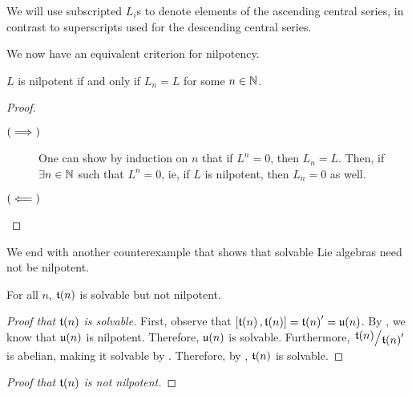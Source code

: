 \begin{boxconvention}
    We will use subscripted $L_i$s to denote elements of the ascending central series, in contrast to superscripts used for the descending central series.
\end{boxconvention}

We now have an equivalent criterion for nilpotency.

\begin{boxproposition}
    $L$ is nilpotent if and only if $L_n = L$ for some $n \in \mathbb{N}$.
\end{boxproposition}
\begin{proof} \hfill
    \begin{description}
        \item[$\left( \implies \right)$]
            One can show by induction on $n$ that if $L^n = 0$, then $L_n = L$. Then, if $\exists n \in \mathbb{N}$ such that $L^n = 0$, ie, if $L$ is nilpotent, then $L_n = 0$ as well.  \sorry %

        \item[$\left( \impliedby \right)$] 
            \sorry
    \end{description}
\end{proof}

We end with another counterexample that shows that solvable Lie algebras need not be nilpotent.

\begin{boxcexample}
    For all $n$, $\mathfrak{t}\!\left( n \right)$ is solvable but not nilpotent.
    \begin{proof}[Proof that $\mathfrak{t}\!\left( n \right)$ is solvable]
        First, observe that $\left[ \mathfrak{t}\!\left( n \right), \mathfrak{t}\!\left( n \right) \right] = \mathfrak{t}\!\left( n \right)' = \mathfrak{u}\!\left( n \right)$. By \sorry, we know that $\mathfrak{u}\!\left( n \right)$ is nilpotent. Therefore, $\mathfrak{u}\!\left( n \right)$ is solvable. Furthermore, $\quotient{\t{n}}{\t{n}'}$ is abelian, making it solvable by \sorry. Therefore, by , $\mathfrak{t}\!\left( n \right)$ is solvable.
    \end{proof}

    \begin{proof}[Proof that $\mathfrak{t}\!\left( n \right)$ is not nilpotent]
        
    \end{proof}
\end{boxcexample}
